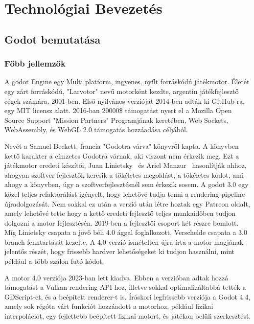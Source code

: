 \documentclass[
]{thesis-ekf}
\theoremstyle{definition}
\theoremstyle{remark}
\begin{document}
\chapter{Technológiai Bevezetés}

\section{Godot bemutatása} %
\subsection{Főbb jellemzők}
A godot Engine egy Multi platform, ingyenes, nyílt forráskódú játékmotor. Életét egy zárt forráskódú, "Larvotor" nevű motorként kezdte, argentin játékfejlesztő cégek számára, 2001-ben\cite{GodotInImages}.
Első nyilvános verzióját 2014-ben adták ki GitHub-ra, egy MIT licensz\cite{MITLicense} alatt. 2016-ban 20000\$ támogatást nyert el a Mozilla Open Source Support "Mission Partners" Programjának keretében, Web Sockets, WebAssembly, és WebGL 2.0 támogatás hozzáadása céljából.\cite{MOSS}

Nevét a Samuel Beckett, francia "Godotra várva"\cite{GodotraVarva} könyvről kapta. A könyvben kettő karakter a címzetes Godotra várnak, aki viszont nem érkezik meg. Ezt a játékmotor eredeti készítői, Juan Linietsky~ és Ariel Manzur~ hasonlítják ahhoz, ahogyan szoftver fejlesztők keresik a tökéletes megoldást, a tökéletes kódot, ami ahogy a könyvben, úgy a szoftverfejlesztésnél sem érkezik sosem.\cite{GodotInImages}
A godot 3.0 egy közel teljes refaktorálást igényelt, hogy lehetővé tudja tenni a rendering-pipeline újradolgozását.\cite{Godot3} Nem sokkal ez után a verzió után létre hoztak egy Patreon oldalt, amely lehetővé tette hogy a kettő eredeti fejlesztő teljes munkaidőben tudjon dolgozni a motor fejlesztésén. 2019-ben a fejlesztői csoport két részre bomlott. Míg Linietsky csapata a jövő béli 4.0 ággal foglalkozott, Verschelde csapata a 3.0 branch fenntartását kezelte. A 4.0 verzió ismételten újra írta a motor magjának jelentős részét, hogy frissebb hardver lehetőségeket ki tudjon használni, mint például a több szálon futó kódot.\cite{Godot2022}

A motor 4.0 verziója 2023-ban lett kiadva. Ebben a verzióban adtak hozzá támogatást a Vulkan rendering API-hoz, illetve sokkal optimalizáltabbá tették a GDScript-et, és a beépített renderer-t is.\cite{Godot4}
Íráskori legfrissebb verziója a Godot 4.4, amely sok régóta várt funkciót hozzáadott a motorhoz, például fizikai interpolációt, egy fejlettebb beépített fizikai motort, és játékon belüli szerkesztést.\cite{Godot44}
\end{document}

